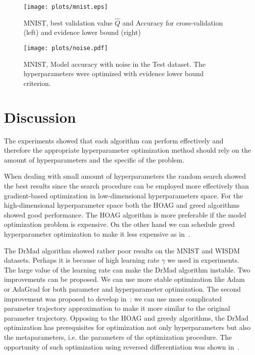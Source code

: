 \documentclass[12pt]{article}
\begin{document}
    \begin{figure}

    \texttt{[image: plots/mnist.eps]}

    \caption{MNIST, best validation value  $\hat{Q}$ and Accuracy  for cross-validation (left) and evidence lower bound (right)}
    \label{fig:mnist}
    \end{figure}

    \begin{figure}

    \texttt{[image: plots/noise.pdf]}

    \caption{MNIST, Model accuracy with noise in the Test dataset. The hyperparameters were optimized with evidence lower bound criterion.}
    \label{fig:noise}
    \end{figure}





\section{Discussion}
The experiments showed that each algorithm can perform effectively and therefore the appropriate hyperparameter optimization method should rely on the amount of hyperparameters and the specific of the problem. 

When dealing with small amount of hyperparameters the random search showed the best results since the search procedure can be employed more effectively than gradient-based optimization in low-dimensional hyperparameters space. For the high-dimensional hyperparameter space both the  HOAG and greed algorithms showed good performance. 
The HOAG algorithm is more preferable if the model optimization problem is expensive. On the other hand we can schedule greed hyperparameter optimization to make it less expensive as in~\cite{hyper_greed}. 

The DrMad algorithm showed rather poor results on the MNIST and WISDM datasets. Perhaps it is because of high learning rate $\gamma$ we used in experiments. The large value of the learning rate can make the DrMad algorithm instable. Two improvements can be proposed. We can use more stable optimization like Adam or AdaGrad for both parameter and hyperparameter optimization. The second improvement was proposed to develop in~\cite{hyper_mad}: we can use more complicated parameter trajectory approximation to make it more similar to the original parameter trajectory. Opposing to the HOAG and greedy algorithms, the DrMad optimization has prerequisites for optimization not only hyperparameters but also the metaparameters, i.e. the parameters  of the optimization procedure. The opportunity of such optimization using reversed differentiation was shown in~\cite{hyper_mad}. 
\end{document}
